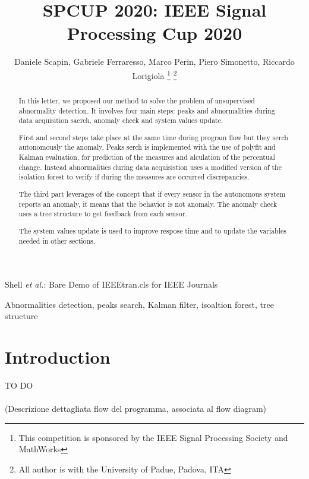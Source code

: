 \documentclass[journal]{IEEEtran}
\begin{document}
\title{SPCUP 2020: IEEE Signal Processing Cup 2020}

\author{Daniele Scapin, Gabriele Ferraresso, Marco Perin, Piero Simonetto, Riccardo Lorigiola
\thanks{This competition is sponsored by the IEEE Signal Processing Society and MathWorks}
\thanks{All author is with the University of Padue, Padova, ITA}}

{Shell \MakeLowercase{\textit{et al.}}: Bare Demo of IEEEtran.cls for IEEE Journals}
\maketitle

\begin{abstract}
In this letter, we proposed our method to solve the problem of unsupervised abnormality detection.
It involves four main steps: peaks and abnormalities during data acquisition saerch, anomaly check and system values update.

First and second steps take place at the same time during program flow but they serch autonomously the anomaly.
Peaks serch is implemented with the use of polyfit and Kalman evaluation, for prediction of the measures and 
alculation of the percentual change. Instead abnormalities during data acquisistion uses a modified version
of the isolation forest to verify if during the measures are occurred discrepancies.

The third part leverages of the concept that if every sensor in the autonomous system reports an anomaly, it means that
the behavior is not anomaly. The anomaly check uses a tree structure to get feedback from each sensor.

The system values update is used to improve respose time and to update the variables needed in other sections.
\end{abstract}

\begin{IEEEkeywords}
Abnormalities detection, peaks search, Kalman filter, isoaltion forest, tree structure
\end{IEEEkeywords}

\IEEEpeerreviewmaketitle{}

\section{Introduction}

\IEEEPARstart
{T}O DO
\\\\(Descrizione dettagliata flow del programma, associata al flow diagram)
\end{document}
